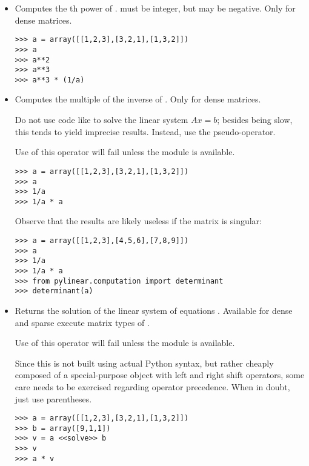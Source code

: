 \begin{itemize} 
\item {}

  Computes the th power of .  must be
  integer, but may be negative. Only for dense matrices.

\begin{verbatim}
>>> a = array([[1,2,3],[3,2,1],[1,3,2]])
>>> a
>>> a**2
>>> a**3
>>> a**3 * (1/a)
\end{verbatim}
\item {}

  Computes the  multiple of the inverse of
  . Only for dense matrices.

  Do not use code like  to solve the linear system
  $Ax=b$; besides being slow, this tends to yield imprecise
  results. Instead, use the  pseudo-operator.

  Use of this operator will fail unless the module
   is available.

\begin{verbatim}
>>> a = array([[1,2,3],[3,2,1],[1,3,2]])
>>> a
>>> 1/a
>>> 1/a * a
\end{verbatim}

  Observe that the results are likely useless if the matrix
  is singular:

\begin{verbatim}
>>> a = array([[1,2,3],[4,5,6],[7,8,9]])
>>> a
>>> 1/a
>>> 1/a * a
>>> from pylinear.computation import determinant
>>> determinant(a)
\end{verbatim}

\item {}

  Returns the solution of the linear system of equations .
  Available for dense and sparse execute matrix types of .

  Use of this operator will fail unless the module
   is available.

  Since this is not built using actual Python syntax, but rather cheaply
  composed of a special-purpose  object with left and right
  shift operators, some care needs to be exercised regarding operator
  precedence. When in doubt, just use parentheses.

\begin{verbatim}
>>> a = array([[1,2,3],[3,2,1],[1,3,2]])
>>> b = array([9,1,1])
>>> v = a <<solve>> b
>>> v
>>> a * v
\end{verbatim}


\end{itemize}
